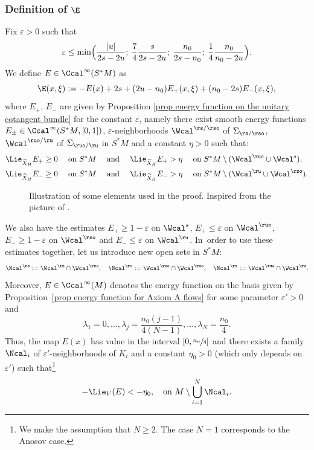 \subsubsection*{Definition of $\E$}
Fix $\varepsilon > 0$ such that
\[
\varepsilon \leq \min \Bigl(\frac{|u|}{2s - 2u}; \: \frac{7}{4}\frac{s}{2s - 2u}; \: \frac{n_0}{2s - n_0} ; \: \frac{1}{4} \frac{n_0}{n_0 - 2u}\Bigr).
\]
We define $E \in \Ccal^{\infty} (S^*M)$ as
\[
\E(x,\xi):= -E(x) + 2s + (2u - n_0) E_+ (x,\xi) + (n_0 - 2s) E_- (x,\xi),
\]
where $E_+$, $E_-$ are given by Proposition \ref{prop energy function on the unitary cotangent bundle} for the constant $\varepsilon$, namely there exist smooth energy functions $E_{\pm} \in \Ccal^{\infty}(S^*M,[0,1])$, $\varepsilon$-neighborhoods $\Wcal^{\rs/\rso}$ of $\Sigma_{\rs/\rso}$, $\Wcal^{\ruo/\ru}$ of $\Sigma_{\ruo/\ru}$ in $S^* M$ and a constant $\eta > 0$ such that:
\begin{align*}
\begin{split}
\Lie_{\widetilde{X}_H} E_{+} &\geq 0 \quad\text{ on } S^* M \quad\text{ and }\quad \Lie_{\widetilde{X}_H} E_{+} > \eta \quad\text{ on } S^* M \setminus (\Wcal^{\ruo} \cup \Wcal^{s}), \\
\Lie_{\widetilde{X}_H} E_{-} &\geq 0 \quad\text{ on } S^* M \quad\text{ and }\quad \Lie_{\widetilde{X}_H} E_{-} > \eta \quad\text{ on } S^* M \setminus (\Wcal^{\ru} \cup \Wcal^{\rso}).
\end{split}
\end{align*}
\begin{figure}[t]
\begin{minipage}[c]{.46\linewidth}
\centering
\def\svgscale{0.7}

\end{minipage}
\begin{minipage}[c]{.46\linewidth}
\centering
\def\svgscale{0.7}

\end{minipage}
\caption{Illustration of some elements used in the proof. Inspired from the picture of \cite[Fig.\,6]{FS}.}
\end{figure}
We also have the estimates $E_{+} \geq 1 - \varepsilon$ on $\Wcal^{s}$, $E_{+} \leq \varepsilon$ on $\Wcal^{\ruo}$, $E_{-} \geq 1 - \varepsilon$ on $\Wcal^{\rso}$ and $E_{-} \leq \varepsilon$ on $\Wcal^{\ru}$. In~order to use these estimates together, let us introduce new open sets in $S^*M$:
\[
\Ncal^{\rs}:= \Wcal^{\rs} \cap \Wcal^{\rso}, \quad \Ncal^{\ro}:= \Wcal^{\rso} \cap \Wcal^{\ruo}, \quad \Ncal^{\ru}:= \Wcal^{\ruo} \cap \Wcal^{\ru}.
\]
Moreover, $E \in \Ccal^{\infty} (M)$ denotes the energy function on the basis given by Proposition~\ref{prop energy function for Axiom A flows} for some parameter $\varepsilon' > 0$ and
\[
\lambda_1 = 0,\dots, \lambda_j = \frac{n_0 (j-1)}{4(N-1)},\dots, \lambda_N = \frac{n_0}{4}.
\]
Thus, the map $E(x)$ has value in the interval $[0, \sfrac{n_0}{4}]$ and there exists a family~$\Ncal_i$ of $\varepsilon'$-neighborhoods of $K_i$ and a constant $\eta_0 > 0$ (which only depends on $\varepsilon'$) such that\footnote{We make the assumption that $N \geq 2$. The case $N=1$ corresponds to the Anosov case.}
\[
- \Lie_V (E) < - \eta_0, \quad \text{on } M \setminus \bigcup_{i = 1}^N \Ncal_i.
\]

